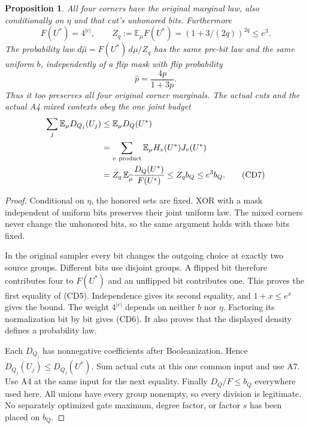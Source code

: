 \documentclass[11pt]{article}
\newtheorem{proposition}{Proposition}
\newcommand{\E}{\mathbb E}
\begin{document}
\begin{proposition}
All four corners have the original marginal law, also conditionally
on $\eta$ and that cut's unhonored bits. Furthermore
\[
 F(U^*)=4^{|e|},\qquad
 Z_q:=\E_\mu F(U^*)=(1+3/(2q))^{2q}\le e^3.             \tag{CD5}
\]
The probability law $d\widehat\mu=F(U^*)\,d\mu/Z_q$
has the same pre-bit law and the same uniform $b$, independently
of a flip mask with flip probability
\[
                       \widehat p=\frac{4p}{1+3p}.       \tag{CD6}
\]
Thus it too preserves all four original corner marginals.
The actual cuts and the actual A4 mixed contexts obey the one
joint budget
\[
 \begin{split}
 \sum_j\E_\mu D_{Q_j}(U_j)
 &\le \E_\mu D_Q(U^*)\\
 &=\sum_{v\ {\rm product}}\E_\mu H_v(U^*)J_v(U^*)\\
 &=Z_q\,\E_{\widehat\mu}\frac{D_Q(U^*)}{F(U^*)}
 \le Z_q b_Q\le e^3b_Q .                               \tag{CD7}
 \end{split}
\]
\end{proposition}
\begin{proof}
Conditional on $\eta$, the honored sets are fixed. XOR with a mask
independent of uniform bits preserves their joint uniform law.
The mixed corners never change the unhonored bits, so the same
argument holds with those bits fixed.

In the original sampler every bit changes the outgoing choice at
exactly two source groups. Different bits use disjoint groups.
A flipped bit therefore contributes four to $F(U^*)$ and an unflipped
bit contributes one. This proves the first equality of (CD5).
Independence gives its second equality, and $1+x\le e^x$ gives
the bound. The weight $4^{|e|}$ depends on neither $b$ nor $\eta$.
Factoring its normalization bit by bit gives (CD6).
It also proves that the displayed density defines a probability law.

Each $D_{Q_j}$ has nonnegative coefficients after Booleanization.
Hence $D_{Q_j}(U_j)\le D_{Q_j}(U^*)$.
Sum actual cuts at this one common input and use A7.
Use A4 at the same input for the next equality.
Finally $D_Q/F\le b_Q$ everywhere used here.
All unions have every group nonempty, so every division is legitimate.
No separately optimized gate maximum, degree factor, or factor $s$
has been placed on $b_Q$.
\end{proof}
\end{document}
